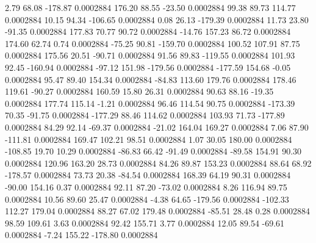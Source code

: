         2.79       68.08     -178.87     0.0002884
      176.20       88.55      -23.50     0.0002884
       99.38       89.73      114.77     0.0002884
       10.15       94.34     -106.65     0.0002884
        0.08       26.13     -179.39     0.0002884
       11.73       23.80      -91.35     0.0002884
      177.83       70.77       90.72     0.0002884
      -14.76      157.23       86.72     0.0002884
      174.60       62.74        0.74     0.0002884
      -75.25       90.81     -159.70     0.0002884
      100.52      107.91       87.75     0.0002884
      175.56       20.51      -90.71     0.0002884
       91.56       89.83     -119.55     0.0002884
      101.93       92.45     -160.94     0.0002884
      -97.12      151.98     -179.56     0.0002884
     -177.59      154.68       -0.05     0.0002884
       95.47       89.40      154.34     0.0002884
      -84.83      113.60      179.76     0.0002884
      178.46      119.61      -90.27     0.0002884
      160.59       15.80       26.31     0.0002884
       90.63       88.16      -19.35     0.0002884
      177.74      115.14       -1.21     0.0002884
       96.46      114.54       90.75     0.0002884
     -173.39       70.35      -91.75     0.0002884
     -177.29       88.46      114.62     0.0002884
      103.93       71.73     -177.89     0.0002884
       84.29       92.14      -69.37     0.0002884
      -21.02      164.04      169.27     0.0002884
        7.06       87.90     -111.81     0.0002884
      169.47      102.21       98.51     0.0002884
        1.07       30.05      180.00     0.0002884
     -108.85       19.70       10.29     0.0002884
      -86.83       66.42      -91.49     0.0002884
      -89.58      154.91       90.30     0.0002884
      120.96      163.20       28.73     0.0002884
       84.26       89.87      153.23     0.0002884
       88.64       68.92     -178.57     0.0002884
       73.73       20.38      -84.54     0.0002884
      168.39       64.19       90.31     0.0002884
      -90.00      154.16        0.37     0.0002884
       92.11       87.20      -73.02     0.0002884
        8.26      116.94       89.75     0.0002884
       10.56       89.60       25.47     0.0002884
       -4.38       64.65     -179.56     0.0002884
     -102.33      112.27      179.04     0.0002884
       88.27       67.02      179.48     0.0002884
      -85.51       28.48        0.28     0.0002884
       98.59      109.61        3.63     0.0002884
       92.42      155.71        3.77     0.0002884
       12.05       89.54      -69.61     0.0002884
       -7.24      155.22     -178.80     0.0002884
